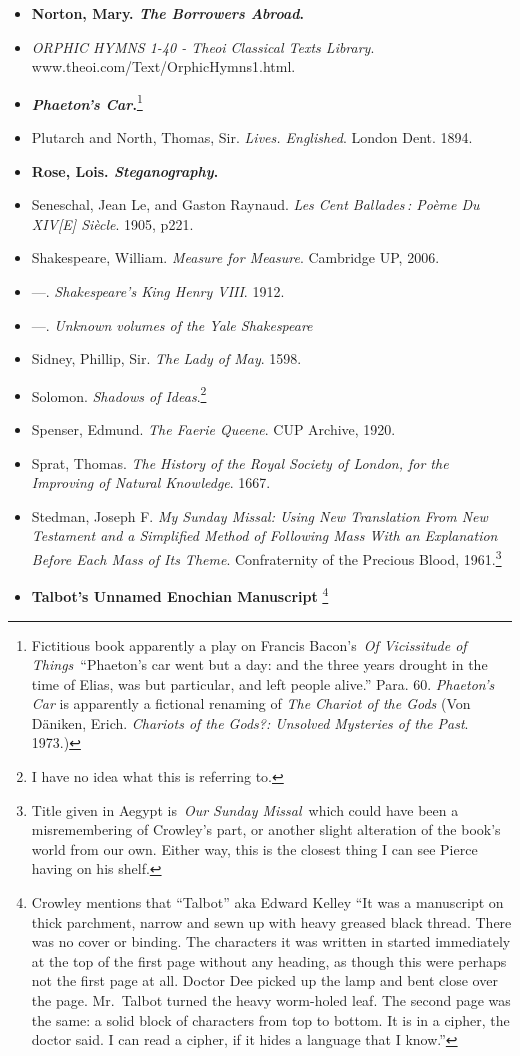 \documentclass[12pt]{article}
\begin{document}
\begin{itemize}
\item
  \textbf{Norton, Mary. \emph{The Borrowers Abroad}.}
\item
  \emph{ORPHIC HYMNS 1-40 - Theoi Classical Texts Library}. www.theoi.com/Text/OrphicHymns1.html.
\item
  \textbf{\emph{Phaeton's Car}.}\footnote{Fictitious book apparently a play on Francis Bacon's~\emph{Of Vicissitude of Things}~``Phaeton's car went but a day: and the three years drought in the time of Elias, was but particular, and left people alive.'' Para. 60. \emph{Phaeton's Car} is apparently a fictional renaming of \emph{The Chariot of the Gods} (Von Däniken, Erich. \emph{Chariots of the Gods?: Unsolved Mysteries of the Past}. 1973.)}
\item
  Plutarch and North, Thomas, Sir. \emph{Lives. Englished}. London Dent. 1894.
\item
  \textbf{Rose, Lois. \emph{Steganography}.}
\item
  Seneschal, Jean Le, and Gaston Raynaud. \emph{Les Cent Ballades\,: Poème Du XIV{[}E{]} Siècle}. 1905, p221.
\item
  Shakespeare, William. \emph{Measure for Measure}. Cambridge UP, 2006.
\item
  \! ---. \emph{Shakespeare's King Henry VIII}. 1912.
\item
  \! ---. \emph{Unknown volumes of the Yale Shakespeare}
\item
  Sidney, Phillip, Sir. \emph{The Lady of May}. 1598.
\item
  Solomon. \emph{Shadows of Ideas}.\footnote{I have no idea what this is referring to.}
\item
  Spenser, Edmund. \emph{The Faerie Queene}. CUP Archive, 1920.
\item
  Sprat, Thomas. \emph{The History of the Royal Society of London, for the Improving of Natural Knowledge}. 1667.
\item
  Stedman, Joseph F. \emph{My Sunday Missal: Using New Translation From New Testament and a Simplified Method of Following Mass With an Explanation Before Each Mass of Its Theme}. Confraternity of the Precious Blood, 1961.\footnote{Title given in Aegypt is~\emph{Our Sunday Missal}~which could have been a misremembering of Crowley's part, or another slight alteration of the book's world from our own. Either way, this is the closest thing I can see Pierce having on his shelf.}
\item
  \textbf{Talbot's Unnamed Enochian Manuscript} \footnote{Crowley mentions that ``Talbot'' aka Edward Kelley ``It was a manuscript on thick parchment, narrow and sewn up with heavy greased black thread. There was no cover or binding. The characters it was written in started immediately at the top of the first page without any heading, as though this were perhaps not the first page at all. Doctor Dee picked up the lamp and bent close over the page. Mr.~Talbot turned the heavy worm-holed leaf. The second page was the same: a solid block of characters from top to bottom. It is in a cipher, the doctor said. I can read a cipher, if it hides a language that I know.''}

\end{itemize}
\end{document}
